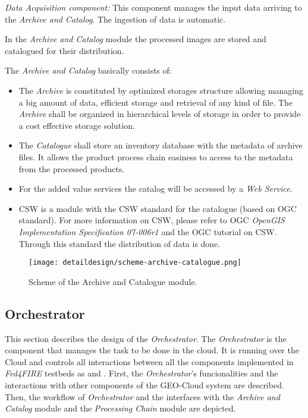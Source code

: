\emph{Data Acquisition component:} This component manages the input data arriving to the \emph{Archive and Catalog}. The ingestion of data is automatic. 

In the \emph{Archive and Catalog} module the processed images are stored and catalogued for their distribution.

The \emph{Archive and Catalog} basically consists of:
\begin{itemize}
\item The \emph{Archive} is constituted by optimized storages structure allowing managing a big amount of data, efficient storage and retrieval of any kind of file. The \emph{Archive} shall be organized in hierarchical levels of storage in order to provide a cost effective storage solution.

\item The \emph{Catalogue} shall store an inventory database with the metadata of archive files. It allows the product process chain easiness to access to the metadata from the processed products.

\item For the added value services the catalog will be accessed by a \emph{Web Service}.

\item \ac{CSW} is a module with the \ac{CSW} standard for the catalogue (based on \ac{OGC} standard). For more information on \ac{CSW}, please refer to \ac{OGC} \emph{OpenGIS Implementation Specification 07-006r1} and the \ac{OGC} tutorial on \ac{CSW}. Through this standard the distribution of data is done. 
\end{itemize}

\begin{figure}[!h]
\begin{center}
\texttt{[image: detaildesign/scheme-archive-catalogue.png]}
\caption{Scheme of the Archive and Catalogue module.}
\label{fig:archive-catalogue-scheme}
\end{center}
\end{figure}


\subsection{Orchestrator}

This section describes the design of the \emph{Orchestrator}. The \emph{Orchestrator} is the
component that manages the task to be done in the cloud. It is running over the
\bonfire Cloud and controls all interactions between all the components implemented in \emph{Fed4FIRE} testbeds as \bonfire and \vw.
First, the \emph{Orchestrator}'s funcionalities and the interactions with other
components of the GEO-Cloud system are described. Then, the workflow of
\emph{Orchestrator} and the interfaces with the \emph{Archive and Catalog} module and the
\emph{Processing Chain} module are depicted.


